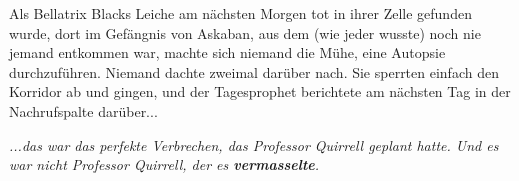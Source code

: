 Als Bellatrix Blacks Leiche am nächsten Morgen tot in ihrer Zelle gefunden
wurde, dort im Gefängnis von Askaban, aus dem (wie jeder wusste) noch nie jemand
entkommen war, machte sich niemand die Mühe, eine Autopsie durchzuführen.
Niemand dachte zweimal darüber nach. Sie sperrten einfach den Korridor ab und
gingen, und der Tagesprophet berichtete am nächsten Tag in der Nachrufspalte
darüber...

\emph{...das war das perfekte Verbrechen, das Professor Quirrell geplant hatte.
Und es war nicht Professor Quirrell, der es \textbf{vermasselte}. }

